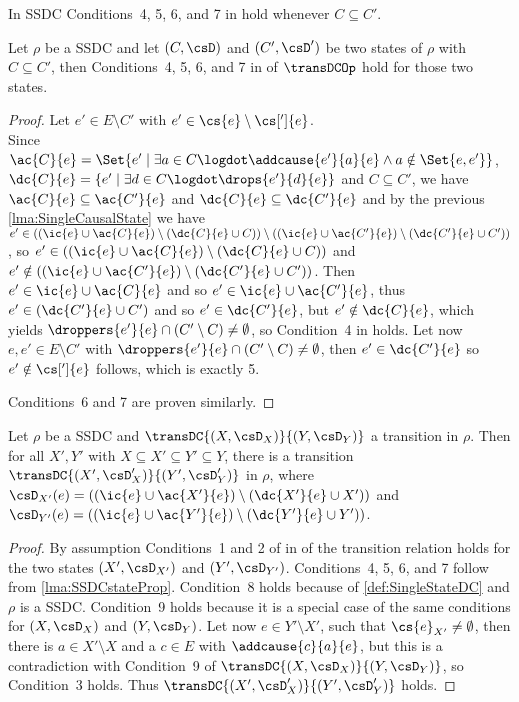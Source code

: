 \documentclass[runningheads,a4paper]{llncs}
\begin{document}
In SSDC Conditions~4, 5, 6, and 7 in \cite{dynamicCausality15} hold whenever $ C \subseteq C' $.

\begin{lemma}
\label{lma:SSDCstateProp}
Let $\rho $ be a SSDC and let $(C,\csD)$ and $(C',\csD')$ be two states of $\rho$ with $C\subseteq C'$, then Conditions~4, 5, 6, and 7 in \cite{dynamicCausality15} of $\transDCOp$ hold for those two states.
\end{lemma}

\begin{proof}
Let $e'\in E\setminus C'$ with $e'\in\cs{e}\setminus\cs[']{e}$.\\
Since $\ac{C}{e}=\Set{ e' \mid \exists a \in C\logdot \addcause{e'}{a}{e} \land a \notin \Set{ e, e' } }$, $\dc{C}{e} = \{ e' \mid \exists d \in C \logdot \drops{e'}{d}{e} \}$ and $ C \subseteq C' $, we have $\ac{C}{e}\subseteq\ac{C'}{e}$ and $\dc{C}{e}\subseteq\dc{C'}{e}$ and by the previous \lem\ref{lma:SingleCausalState} we have $e'\in ((\ic{e} \cup\ac{C}{e}) \setminus (\dc{C}{e}\cup C))\setminus((\ic{e} \cup\ac{C'}{e}) \setminus (\dc{C'}{e}\cup C'))$, so $e'\in((\ic{e} \cup\ac{C}{e}) \setminus (\dc{C}{e}\cup C))$ and $e'\notin((\ic{e} \cup\ac{C'}{e}) \setminus (\dc{C'}{e}\cup C'))$. Then $e'\in\ic{e}\cup\ac{C}{e}$ and so $e'\in\ic{e}\cup\ac{C'}{e}$, thus $e'\in(\dc{C'}{e}\cup C')$ and so $e'\in\dc{C'}{e}$, but $e'\notin\dc{C}{e}$, which yields $\droppers{e'}{e}\cap(C'\setminus C)\neq\emptyset$, so Condition~4 in \cite{dynamicCausality15} holds. Let now $e,e'\in E\setminus C'$ with $\droppers{e'}{e}\cap(C'\setminus C)\neq\emptyset$, then $e'\in\dc{C'}{e}$ so $e'\notin\cs[']{e}$ follows, which is exactly 5. 

Conditions~6 and 7 are proven similarly.
\end{proof}

\begin{lemma}
\label{lma:SSDCConfInTrans}
Let $\rho$ be a SSDC and $\transDC{(X,\csD_X)}{(Y,\csD_Y)}$ a transition in $\rho$. Then for all $X',Y'$ with $X\subseteq X'\subseteq Y'\subseteq Y$, there is a transition $\transDC{(X',\csD_X')}{(Y',\csD_Y')}$ in $\rho$, where $\csD_{X'}(e)=((\ic{e} \cup\ac{X'}{e}) \setminus (\dc{X'}{e}\cup X'))$ and $\csD_{Y'}(e) = ((\ic{e} \cup\ac{Y'}{e}) \setminus (\dc{Y'}{e}\cup Y'))$.
\end{lemma}

\begin{proof}
By assumption Conditions~1 and 2 of  in \cite{dynamicCausality15} of the
transition relation holds for the two states $(X',\csD_{X'})$ and
$(Y',\csD_{Y'})$. Conditions~4,
5, 6, and
7 follow from \lem\ref{lma:SSDCstateProp}.
Condition~8 holds because of \ref{def:SingleStateDC} and $\rho$ is a SSDC. Condition~9 holds because it is a special case of the same conditions for $(X,\csD_X)$ and $(Y,\csD_Y)$. Let now $e\in Y'\setminus X'$, such that $\cs{e}_{X'}\neq \emptyset$, then there is $a\in X'\setminus X$ and a $ c \in E$ with $\addcause{c}{a}{e}$, but this is a contradiction with Condition~9 of $\transDC{(X,\csD_X)}{(Y,\csD_Y)}$, so Condition~3 holds. Thus $\transDC{(X',\csD_X')}{(Y',\csD_Y')}$ holds.
\end{proof}
\end{document}
